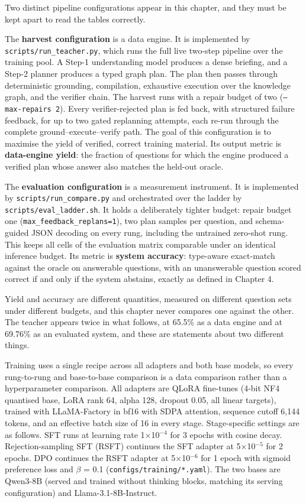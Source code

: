 Two distinct pipeline configurations appear in this chapter, and they must be kept apart to
read the tables correctly.

The \textbf{harvest configuration} is a data engine. It is implemented by \texttt{scripts/run\_teacher.py},
which runs the full live two-step pipeline over the training pool. A Step-1 understanding
model produces a dense briefing, and a Step-2 planner produces a typed graph plan. The plan
then passes through deterministic grounding, compilation, exhaustive execution over the
knowledge graph, and the verifier chain. The harvest runs with a repair budget of two
(\texttt{--max-repairs 2}). Every verifier-rejected plan is fed back, with structured failure
feedback, for up to two gated replanning attempts, each re-run through the complete
ground--execute--verify path. The goal of this configuration is to maximise the yield of
verified, correct training material. Its output metric is \textbf{data-engine yield}: the fraction
of questions for which the engine produced a verified plan whose answer also matches the
held-out oracle.

The \textbf{evaluation configuration} is a measurement instrument. It is implemented by
\texttt{scripts/run\_compare.py} and orchestrated over the ladder by \texttt{scripts/eval\_ladder.sh}. It
holds a deliberately tighter budget: repair budget one (\texttt{max\_feedback\_replans=1}), two plan
samples per question, and schema-guided JSON decoding on every rung, including the untrained
zero-shot rung. This keeps all cells of the evaluation matrix comparable under an identical
inference budget. Its metric is \textbf{system accuracy}: type-aware exact-match against the oracle
on answerable questions, with an unanswerable question scored correct if and only if the
system abstains, exactly as defined in Chapter 4.

Yield and accuracy are different quantities, measured on different question sets under
different budgets, and this chapter never compares one against the other. The teacher appears
twice in what follows, at 65.5\% as a data engine and at 69.76\% as an evaluated system, and
these are statements about two different things.

Training uses a single recipe across all adapters and both base models, so every rung-to-rung
and base-to-base comparison is a data comparison rather than a hyperparameter comparison. All
adapters are QLoRA fine-tunes (4-bit NF4 quantised base, LoRA rank 64, alpha 128, dropout
0.05, all linear targets), trained with LLaMA-Factory in bf16 with SDPA attention, sequence
cutoff 6,144 tokens, and an effective batch size of 16 in every stage. Stage-specific settings
are as follows. SFT runs at learning rate 1$\times$10$^{-4}$ for 3 epochs with cosine decay.
Rejection-sampling SFT (RSFT) continues the SFT adapter at 5$\times$10$^{-5}$ for 2 epochs. DPO continues
the RSFT adapter at 5$\times$10$^{-6}$ for 1 epoch with sigmoid preference loss and $\beta$ = 0.1
(\texttt{configs/training/*.yaml}). The
two bases are Qwen3-8B (served and trained without thinking blocks, matching its serving
configuration) and Llama-3.1-8B-Instruct.


